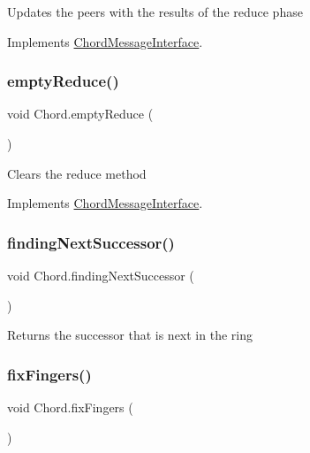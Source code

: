 Updates the peers with the results of the reduce phase 

Implements \mbox{\hyperlink{interface_chord_message_interface}{Chord\+Message\+Interface}}.

\mbox{\label{class_chord_a14ffe65b5fed6f1e10c5957fe6b9202a}} 
\subsubsection{\texorpdfstring{empty\+Reduce()}{emptyReduce()}}
{\footnotesize\ttfamily void Chord.\+empty\+Reduce (\begin{DoxyParamCaption}{ }\end{DoxyParamCaption})\hspace{0.3cm}{\ttfamily [inline]}}

Clears the reduce method 

Implements \mbox{\hyperlink{interface_chord_message_interface}{Chord\+Message\+Interface}}.

\mbox{\label{class_chord_a65c855dc1d8c6a82545899cb823dba2e}} 
\subsubsection{\texorpdfstring{finding\+Next\+Successor()}{findingNextSuccessor()}}
{\footnotesize\ttfamily void Chord.\+finding\+Next\+Successor (\begin{DoxyParamCaption}{ }\end{DoxyParamCaption})\hspace{0.3cm}{\ttfamily [inline]}}

Returns the successor that is next in the ring \mbox{\label{class_chord_a02763f74bbd986baa7e6567bf9dc3c95}} 
\subsubsection{\texorpdfstring{fix\+Fingers()}{fixFingers()}}
{\footnotesize\ttfamily void Chord.\+fix\+Fingers (\begin{DoxyParamCaption}{ }\end{DoxyParamCaption})\hspace{0.3cm}{\ttfamily [inline]}}

